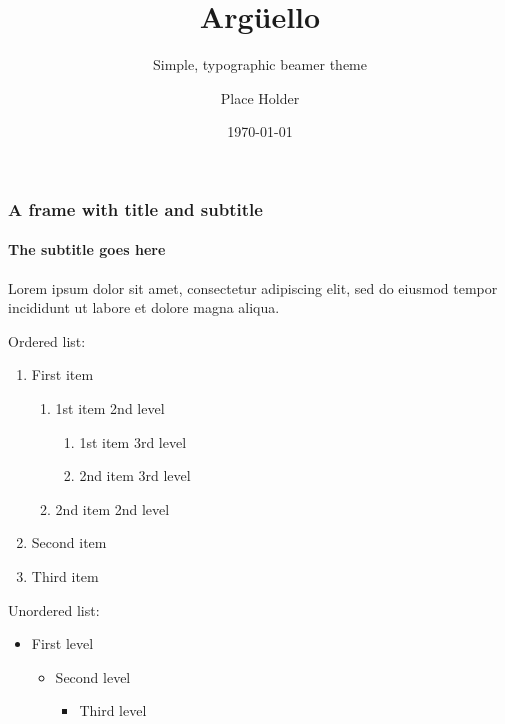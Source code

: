 \documentclass{beamer}
\title{Argüello}
\subtitle{Simple, typographic beamer theme}
\date{\today}
\author{Place Holder}
\institute{University of Lua\LaTeX\par\email{username@domain.com}}
\begin{document}

\begin{frame}
      \frametitle{A frame with title and subtitle}
      \framesubtitle{The subtitle goes here}
      Lorem ipsum dolor sit amet, consectetur adipiscing elit, sed do eiusmod tempor incididunt ut labore et dolore magna aliqua.\par
      \vfill
      Ordered list:
      \begin{enumerate}
            \item First item
                  \begin{enumerate}
                        \item 1st item 2nd level
                              \begin{enumerate}
                                    \item 1st item 3rd level
                                    \item 2nd item 3rd level
                              \end{enumerate}
                        \item 2nd item 2nd level
                  \end{enumerate}
            \item Second item
            \item Third item
      \end{enumerate}
      \vfill
      Unordered list:
      \begin{itemize}
            \item First level
                  \begin{itemize}
                        \item Second level
                              \begin{itemize}
                                    \item Third level
                              \end{itemize}
                  \end{itemize}
      \end{itemize}
\end{frame}
\end{document}
